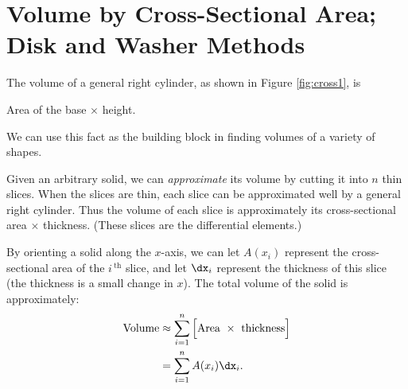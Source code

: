 \section{Volume by Cross-Sectional Area; Disk and Washer Methods}\label{sec:disk}

The volume of a general right cylinder, as shown in Figure \ref{fig:cross1}, is 

\hfill Area of the base $\times$ height. \hfill\null


\noindent We can use this fact as the building block in finding volumes of a variety of shapes.

Given an arbitrary solid, we can \textit{approximate} its volume by cutting it into $n$  thin slices. When the slices are thin, each slice can be approximated well by a general right cylinder. Thus the volume of each slice is approximately its cross-sectional area $\times$ thickness. (These slices are the differential elements.)

By orienting a solid along the $x$-axis, we can let $A(x_i)$ represent the cross-sectional area
of the $i\,^\text{th}$ slice, and let $\dx_i$ represent the thickness of this slice (the thickness is a small change in $x$). The total volume of the solid is approximately:
	\begin{align*} \text{Volume} &\approx \sum_{i=1}^n \Big[\text{Area}\ \times\ \text{thickness}\Big] \\
			&= \sum_{i=1}^n A(x_i)\dx_i.
	\end{align*}
	
